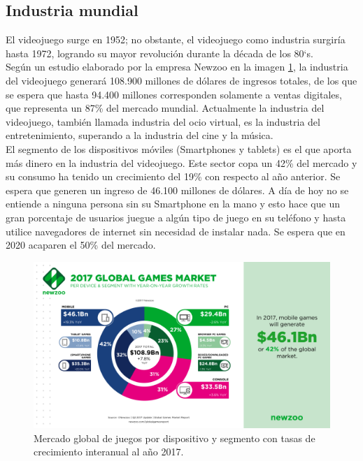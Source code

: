 		
\subsection{Industria mundial}
			 
			 El videojuego surge en 1952; no obstante, el videojuego como industria surgiría hasta 1972, logrando su mayor revolución durante la década de los 80`s. 
			 \\[1pt]
			 
			 Según un estudio elaborado por la empresa Newzoo en la imagen \ref{fig:newzooIndMun}, la industria del videojuego generará 108.900 millones de dólares de ingresos totales, de los que se espera que hasta 94.400 millones corresponden solamente a ventas digitales, que representa un 87\% del mercado mundial. Actualmente la industria del videojuego, también llamada industria del ocio virtual, es la industria del entretenimiento, superando a la industria del cine y la música.
			 \\[1pt]	
			 
			 El segmento de los dispositivos móviles (Smartphones y tablets) es el que aporta más dinero en la industria del videojuego. Este sector copa un 42\% del mercado y su consumo ha tenido un crecimiento del 19\% con respecto al año anterior. Se espera que generen un ingreso de 46.100 millones de dólares. A día de hoy no se entiende a ninguna persona sin su Smartphone en la mano y esto hace que un gran porcentaje de usuarios juegue a algún tipo de juego en su teléfono y hasta utilice navegadores de internet sin necesidad de instalar nada. Se espera que en 2020 acaparen el 50\% del mercado. \cite{vid01}
			 \\[1pt]   
			 
			 	\begin{figure}
			 	\centering
			 	\includegraphics[width=\textwidth]{03MarcoTeorico/imageR/newzooIndMun.png}
			 	\caption{Mercado global de juegos por dispositivo y segmento con tasas de crecimiento interanual al año 2017.}
			 	\label{fig:newzooIndMun}
			 \end{figure}	
			 
